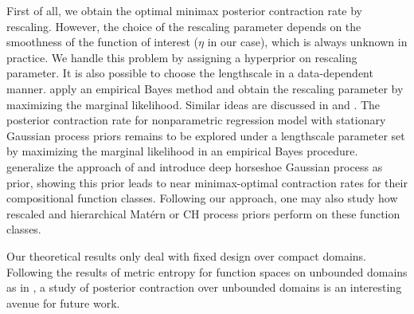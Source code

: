 \documentclass[ejs,noshowframe]{imsart}
\theoremstyle{plain}
\theoremstyle{definition}
\theoremstyle{remark}
\begin{document}
First of all, we obtain the optimal minimax posterior contraction rate by rescaling. However,   the choice of the rescaling parameter depends on the smoothness of the function of interest ($\eta$ in our case), which is always unknown in practice. We handle this problem by assigning  a hyperprior on  rescaling parameter.  It is also possible to  choose the lengthscale in a data-dependent manner.  \cite{szabo2013empirical} apply an empirical Bayes method and obtain  the rescaling parameter by  maximizing the marginal likelihood. Similar ideas are discussed  in \cite{knapik2016bayes} and \citet{rousseau2017asymptotic}.
The posterior contraction rate for nonparametric regression model with stationary Gaussian process priors remains to be explored under a lengthscale parameter set by maximizing the marginal likelihood in an empirical Bayes procedure. { \cite{castillo2024deep} generalize the approach of \cite{van2009adaptive} and introduce deep horseshoe Gaussian process as prior, showing this prior leads to near minimax-optimal contraction rates  for their compositional function classes. Following our approach, one may also study how rescaled and hierarchical  Mat\'ern or CH process priors perform on these function classes.}

Our theoretical results  only deal with fixed design over  compact domains.  Following  the results of metric entropy  for function spaces on unbounded domains as in  \cite{nickl2007bracketing}, a study of posterior contraction over unbounded domains is an interesting avenue for  future work.
\end{document}
